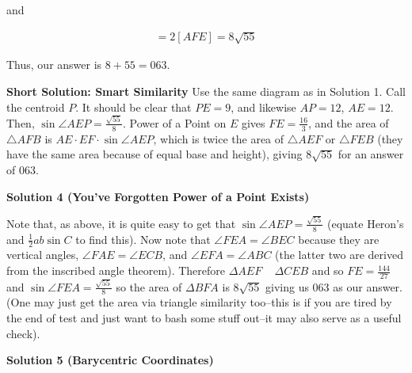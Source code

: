 \begin{enumerate}
 

 and

 
 \begin{align*} [AFB]=2[AFE]=8\sqrt{55} \end{align*}


 

 Thus, our answer is $8+55=\boxed{063}$.

 \textbf{Short Solution: Smart Similarity} Use the same diagram as in Solution 1. Call the centroid $P$. It should be clear that $PE=9$, and likewise $AP=12$, $AE=12$. Then, $\sin \angle AEP = \frac{\sqrt{55}}{8}$. Power of a Point on $E$ gives $FE=\frac{16}{3}$, and the area of $\triangle AFB$ is $AE \cdot EF \cdot \sin \angle AEP$, which is twice the area of $\triangle AEF$ or $\triangle FEB$ (they have the same area because of equal base and height), giving $8\sqrt{55}$ for an answer of $\boxed{063}$.

 



\textbf{Solution 4 (You've Forgotten Power of a Point Exists)}

Note that, as above, it is quite easy to get that $\sin \angle AEP = \frac{\sqrt{55}}{8}$ (equate Heron's and $\frac{1}{2}ab\sin C$ to find this). Now note that $\angle FEA = \angle BEC$ because they are vertical angles, $\angle FAE = \angle ECB$, and $\angle EFA = \angle ABC$ (the latter two are derived from the inscribed angle theorem). Therefore $\Delta AEF$ ~ $\Delta CEB$ and so $FE = \frac{144}{27}$ and $\sin \angle FEA = \frac{\sqrt{55}}{8}$ so the area of $\Delta BFA$ is $8\sqrt{55}$ giving us $\boxed{063}$ as our answer. (One may just get the area via triangle similarity too--this is if you are tired by the end of test and just want to bash some stuff out--it may also serve as a useful check). 

 



\textbf{Solution 5 (Barycentric Coordinates)}


\end{enumerate}
